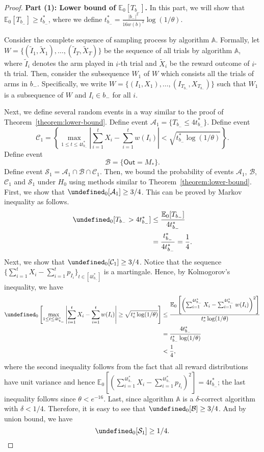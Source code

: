 \documentclass{article}
\newcommand{\E}{\mathbb E}
\newcommand{\out}{\mathsf{Out}}
\let\Pr\undefined
\DeclareMathOperator{\Pr}{Pr}
\begin{document}
\begin{spacing}{1.1}
\begin{proof}
\textbf{Part (1): Lower bound of $\E_0[T_{b_-}]$.}
In this part, we will show that $\E_0[T_{b_-}]\ge t_{b_-}^*$, where we define $t_{b_-}^* = \frac{|b_-|^2}{16 w(b)^2}\log(1/\theta)$.

Consider the complete sequence of sampling process by algorithm $\mathbb A$.
Formally, let $W=\{(\tilde I_1,\tilde X_1),\ldots, (\tilde I_T, \tilde X_T)\}$ be the sequence of all trials by algorithm $\mathbb A$, where $\tilde I_i$ denotes the arm played in $i$-th trial and $\tilde X_i$ be the reward outcome of $i$-th trial.
Then, consider the subsequence $W_1$ of $W$ which consists all the trials of arms in $b_-$.
Specifically, we write $W=\{(I_1,X_1),\ldots,(I_{T_{b_-}}, X_{T_{b_-}})\}$ such that $W_1$ is a subsequence of $W$ and $I_i \in b_-$ for all $i$.

Next, we define several random events in a way similar to the proof of Theorem~\ref{theorem:lower-bound}.
Define event
$\mathcal A_1 = \{T_{b_-} \le 4t_{b_-}^* \}$.
Define event 
$$
\mathcal C_1 = \left\{\max_{1\le t \le 4t_{b_-}^*} \left|\sum_{i=1}^t X_i - \sum_{i=1}^t w(I_i)\right|  < \sqrt{t_{b_-}^*\log(1/\theta)} \right\}.
$$
Define event 
\begin{equation}
\label{eq:lower-sum-b-define}
\mathcal B = \{\out=M_*\}.
\end{equation}
Define event
$\mathcal S_1 = \mathcal A_1 \cap \mathcal B \cap \mathcal C_1$.
Then, we bound the probability of events $\mathcal A_1$, $\mathcal B$, $\mathcal C_1$ and $\mathcal S_1$ under $H_0$ using methods similar to Theorem~\ref{theorem:lower-bound}.
First, we show that $\Pr_0[\mathcal A_1] \ge 3/4$. 
This can be proved by Markov inequality as follows.
\begin{align*}
\Pr_0[T_{b_-} > 4t_{b_-}^*] &\le \frac{\E_0[T_{b_-}]}{4t_{b_-}^*} \\
					  &= \frac{t_{b_-}^*}{4t_{b_-}^*} = \frac14.
\end{align*}
Next, we show that $\Pr_0[\mathcal C_1] \ge 3/4$.
Notice that the sequence $\Big\{\sum_{i=1}^t X_i - \sum_{i=1}^t p_{I_i}\Big\}_{t\in[4t_{b_-}^*]}$ is a martingale.
Hence, by Kolmogorov's inequality, we have
\begin{align*}
\Pr_0\left[\max_{1\le t \le 4t_{b_-}^*} \left|\sum_{i=1}^t X_i - \sum_{i=1}^t w(I_i) \right| \ge \sqrt{t_e^*\log(1/\theta)} \right]
&\le \frac{\E_0\left[ \left(\sum_{i=1}^{4t_{b_-}^*} X_i - \sum_{i=1}^{4t_{b_-}^*} w(I_i)\right)^2\right]}{t_e^*\log(1/\theta)}\\
&= \frac{4t_{b_-}^*}{t_{b_-}^*\log(1/\theta)}\\
&< \frac14,
\end{align*}
where the second inequality follows from the fact that all reward distributions have unit variance and hence
$\E_0\left[ \left(\sum_{i=1}^{4t_{b_-}^*} X_i - \sum_{i=1}^{4t_{b_-}^*} p_{I_i}\right)^2\right] = 4t_{b_-}^*$; the last inequality follows 
since $\theta < e^{-16}$.
Last, since algorithm $\mathbb A$ is a $\delta$-correct algorithm with $\delta < 1/4$. 
Therefore, it is easy to see that 
$\Pr_0[\mathcal B] \ge 3/4$.
And by union bound, we have
$$
\Pr_0[\mathcal S_1] \ge 1/4.
$$


\end{proof}
\end{spacing}
\end{document}
